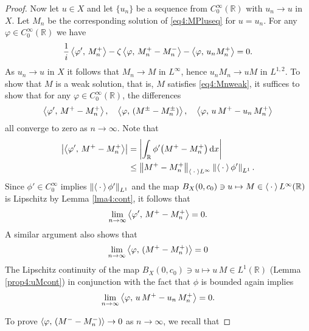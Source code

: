 \documentclass[../dissertation.tex]{subfiles}
\begin{document}
\begin{proof}
	Now let $u \in X$ and let $\{ u_n \}$ be a sequence from $C_0^\infty(\mathbb R)$ 
	with $u_n \to u$ in $X$. Let $M_n$ be the corresponding solution of 
	\eqref{eq4:MPluseq} for $u=u_n$. For any $\varphi \in C_0^\infty(\mathbb R)$ we have
	\begin{align}\label{eq4:Mnweak}
		\frac{1}{i} \left\langle \varphi', \, M^+_n \right\rangle - \zeta \left\langle \varphi,\,M_n^+ - M_n^- \right\rangle  
			- \left\langle \varphi, \, u_n M^+_n \right\rangle = 0.
	\end{align}
	As $u_n \to u$ in $X$ it follows that $M_n \to M$ in $L^\infty$, hence 
	$u_n M_n \to uM$ in $L^{1,2}$. To show that $M$ is a weak solution, 
	that is, $M$ satisfies \eqref{eq4:Mnweak}, it
	suffices to show that for any $\varphi \in C_0^\infty(\mathbb R)$,  the 
	differences
	\[
		\left\langle \varphi', \, M^+-M^+_n \right\rangle, \quad
		\left\langle \varphi, \, (M^\pm - M_n^\pm) \right\rangle, \quad
		\left\langle \varphi, \, u\,M^+ - u_n\,M_n^+ \right\rangle
	\]
	all converge to zero as $n \to \infty$. 
	Note that 
	\begin{align*}
		\left|\left\langle \varphi', \, M^+-M^+_n \right\rangle\right|
			&= \left|\int_{\mathbb R} \phi'\big(M^+ - M_n^+\big) \, \mathrm{d}x \right| \\
			&\leq \left\| M^+ - M_n^+ \right\|_{\left\langle \kern 0.5ex \cdot \kern 0.5ex \right\rangle L^\infty} \left\| \left\langle \kern 0.5ex \cdot \kern 0.5ex \right\rangle\phi' \right\|_{L^1}.
	\end{align*}
	Since $\phi' \in C_0^\infty$ implies $\left\| \left\langle \kern 0.5ex \cdot \kern 0.5ex \right\rangle\phi' \right\|_{L^1}$ and the map 
	$B_X(0, c_0) \ni u \mapsto M\in\left\langle \kern 0.5ex \cdot \kern 0.5ex \right\rangle L^\infty(\mathbb R)$ is Lipschitz
	by Lemma \ref{lma4:cont}, it follows that
	\[
		\lim_{n\to\infty} \left\langle \varphi', \, M^+-M^+_n \right\rangle = 0.
	\]
	A similar argument also shows that 
	\[
		\lim_{n\to\infty} \left\langle \varphi, \, (M^+ - M_n^+) \right\rangle= 0
	\]
	The Lipschitz continuity of the map 
	$B_X(0, c_0) \ni u \mapsto u\,M \in L^1(\mathbb R)$ (Lemma \ref{prop4:uMcont}) 
	in conjunction with the fact that $\phi$ is bounded again implies
	\[
		\lim_{n\to\infty} \left\langle \varphi, \, u\,M^+ - u_n\,M_n^+ \right\rangle = 0.
	\]

	To prove $\left\langle \varphi, \, (M^- - M_n^-) \right\rangle \to 0$ as $n \to \infty$, we 
	recall that


\end{proof}
\end{document}
